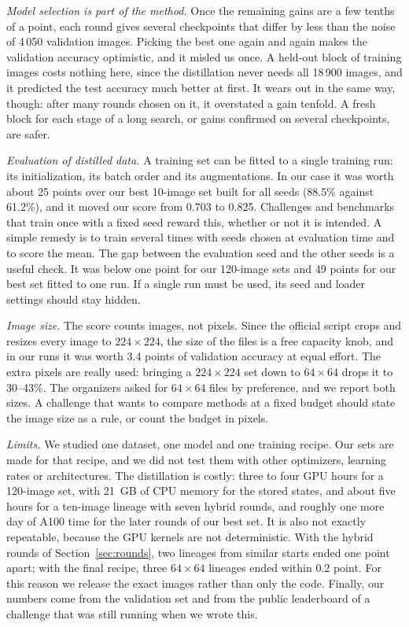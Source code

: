 \documentclass[journal]{IEEEtran}
\begin{document}
\emph{Model selection is part of the method.} Once the remaining gains are a few tenths of a point, each round gives
several checkpoints that differ by less than the noise of 4\,050 validation images. Picking the best one again and
again makes the validation accuracy optimistic, and it misled us once. A held-out block of training images costs
nothing here, since the distillation never needs all 18\,900 images, and it predicted the test accuracy much
better at first. It wears out in the same way, though: after many rounds chosen on it, it overstated a gain tenfold.
A fresh block for each stage of a long search, or gains confirmed on several checkpoints, are safer.

\emph{Evaluation of distilled data.} A training set can be fitted to a single training run: its initialization, its
batch order and its augmentations. In our case it was worth about 25 points over our best 10-image set built for all
seeds (88.5\% against 61.2\%), and it moved our score from 0.703 to 0.825. Challenges and benchmarks that train
once with a fixed seed reward this, whether or not it is intended. A simple remedy is to train several times with
seeds chosen at evaluation time and to score the mean. The gap between the evaluation seed and the other seeds is a useful check. It was below
one point for our 120-image sets and 49 points for our best set fitted to one run. If a single run must be used,
its seed and loader settings should stay hidden.

\emph{Image size.} The score counts images, not pixels. Since the official script crops and resizes every image to
$224\times224$, the size of the files is a free capacity knob, and in our runs it was worth 3.4 points of validation
accuracy at equal effort. The extra pixels are really used: bringing a $224\times224$ set down to $64\times64$
drops it to 30--43\%. The organizers asked for $64\times64$ files by preference, and we report both sizes. A
challenge that wants to compare methods at a fixed budget should state the image size as a rule, or count the
budget in pixels.

\emph{Limits.} We studied one dataset, one model and one training recipe. Our sets are made for that recipe, and we
did not test them with other optimizers, learning rates or architectures. The distillation is costly: three to four
GPU hours for a 120-image set, with 21~GB of CPU memory for the stored states, and about five hours for a ten-image
lineage with seven hybrid rounds, and roughly one more day of A100 time for the later rounds of our best set. It is
also not exactly repeatable, because the GPU kernels are not deterministic. With the hybrid rounds of
Section~\ref{sec:rounds}, two lineages from similar starts ended one point apart; with the final recipe, three
$64\times64$ lineages ended within 0.2 point. For this reason we release the exact images rather than
only the code. Finally, our numbers come from the validation set and from the public leaderboard of a challenge that
was still running when we wrote this.
\end{document}
